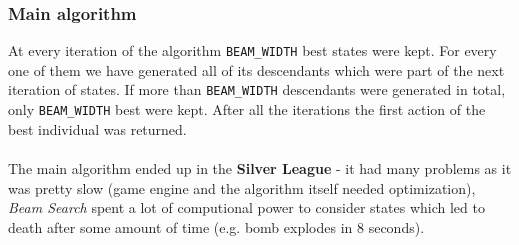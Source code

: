 \documentclass[11pt]{article}
\begin{document}
	\subsubsection*{Main algorithm}
	At every iteration of the algorithm \texttt{BEAM\_WIDTH} best states were kept. For every one of them we have generated all of its descendants which were part of the next iteration of states. If more than \texttt{BEAM\_WIDTH} descendants were generated in total, only \texttt{BEAM\_WIDTH} best were kept. After all the iterations the first action of the best individual was returned. \\ \\
    The main algorithm ended up in the \textbf{Silver League} - it had many problems as it was pretty slow (game engine and the algorithm itself needed optimization), \textit{Beam Search} spent a lot of computional power to consider states which led to death after some amount of time (e.g. bomb explodes in 8 seconds).
    
\end{document}
